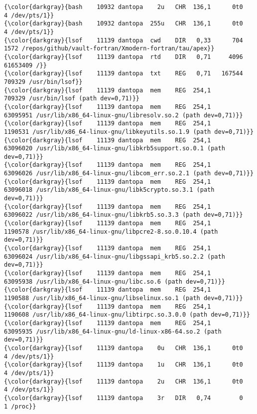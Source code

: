 {{{\begin{Verbatim}[commandchars=\\\{\}]
{\color{darkgray}{bash    10932 dantopa    2u   CHR  136,1      0t0        4 /dev/pts/1}}
{\color{darkgray}{bash    10932 dantopa  255u   CHR  136,1      0t0        4 /dev/pts/1}}
{\color{darkgray}{lsof    11139 dantopa  cwd    DIR   0,33      704     1572 /repos/github/vault-fortran/Xmodern-fortran/tau/apex}}
{\color{darkgray}{lsof    11139 dantopa  rtd    DIR   0,71     4096 61653409 /}}
{\color{darkgray}{lsof    11139 dantopa  txt    REG   0,71   167544   709329 /usr/bin/lsof}}
{\color{darkgray}{lsof    11139 dantopa  mem    REG  254,1            709329 /usr/bin/lsof (path dev=0,71)}}
{\color{darkgray}{lsof    11139 dantopa  mem    REG  254,1          63095951 /usr/lib/x86_64-linux-gnu/libresolv.so.2 (path dev=0,71)}}
{\color{darkgray}{lsof    11139 dantopa  mem    REG  254,1           1190531 /usr/lib/x86_64-linux-gnu/libkeyutils.so.1.9 (path dev=0,71)}}
{\color{darkgray}{lsof    11139 dantopa  mem    REG  254,1          63096020 /usr/lib/x86_64-linux-gnu/libkrb5support.so.0.1 (path dev=0,71)}}
{\color{darkgray}{lsof    11139 dantopa  mem    REG  254,1          63096026 /usr/lib/x86_64-linux-gnu/libcom_err.so.2.1 (path dev=0,71)}}
{\color{darkgray}{lsof    11139 dantopa  mem    REG  254,1          63096018 /usr/lib/x86_64-linux-gnu/libk5crypto.so.3.1 (path dev=0,71)}}
{\color{darkgray}{lsof    11139 dantopa  mem    REG  254,1          63096022 /usr/lib/x86_64-linux-gnu/libkrb5.so.3.3 (path dev=0,71)}}
{\color{darkgray}{lsof    11139 dantopa  mem    REG  254,1           1190578 /usr/lib/x86_64-linux-gnu/libpcre2-8.so.0.10.4 (path dev=0,71)}}
{\color{darkgray}{lsof    11139 dantopa  mem    REG  254,1          63096024 /usr/lib/x86_64-linux-gnu/libgssapi_krb5.so.2.2 (path dev=0,71)}}
{\color{darkgray}{lsof    11139 dantopa  mem    REG  254,1          63095938 /usr/lib/x86_64-linux-gnu/libc.so.6 (path dev=0,71)}}
{\color{darkgray}{lsof    11139 dantopa  mem    REG  254,1           1190588 /usr/lib/x86_64-linux-gnu/libselinux.so.1 (path dev=0,71)}}
{\color{darkgray}{lsof    11139 dantopa  mem    REG  254,1           1190608 /usr/lib/x86_64-linux-gnu/libtirpc.so.3.0.0 (path dev=0,71)}}
{\color{darkgray}{lsof    11139 dantopa  mem    REG  254,1          63095935 /usr/lib/x86_64-linux-gnu/ld-linux-x86-64.so.2 (path dev=0,71)}}
{\color{darkgray}{lsof    11139 dantopa    0u   CHR  136,1      0t0        4 /dev/pts/1}}
{\color{darkgray}{lsof    11139 dantopa    1u   CHR  136,1      0t0        4 /dev/pts/1}}
{\color{darkgray}{lsof    11139 dantopa    2u   CHR  136,1      0t0        4 /dev/pts/1}}
{\color{darkgray}{lsof    11139 dantopa    3r   DIR   0,74        0        1 /proc}}

\end{Verbatim}}}}
